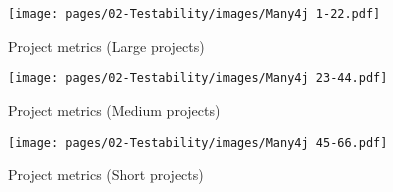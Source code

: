 \begin{figure}[h!]
    \centering    
    \texttt{[image: pages/02-Testability/images/Many4j 1-22.pdf]}
    \caption{Project metrics (Large projects)}
    \label{fig:many4j-1-bar-chart}
\end{figure}%
\begin{figure}[h!]
    \centering    
    \texttt{[image: pages/02-Testability/images/Many4j 23-44.pdf]}
    \caption{Project metrics (Medium projects)}
    \label{fig:many4j-2-bar-chart}
\end{figure} 
\begin{figure}[h!]
    \centering    
    \texttt{[image: pages/02-Testability/images/Many4j 45-66.pdf]}
    \caption{Project metrics (Short projects)}
    \label{fig:many4j-3-bar-chart}
\end{figure}
